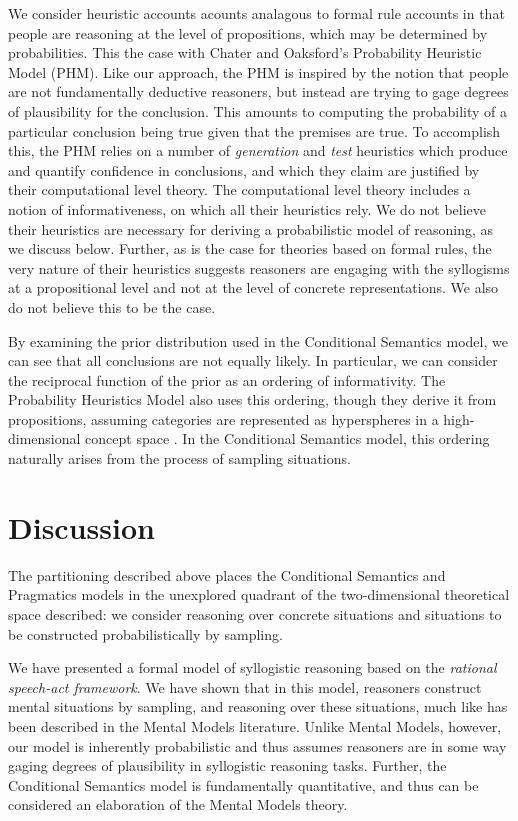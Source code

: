 \documentclass[10pt,letterpaper]{article}
\begin{document}
We consider heuristic accounts acounts analagous to formal rule accounts in that people are reasoning at the level of propositions, which may be determined by probabilities. This the case with Chater and Oaksford's Probability Heuristic Model (PHM). Like our approach, the PHM is inspired by the notion that people are not fundamentally deductive reasoners, but instead are trying to gage degrees of plausibility for the conclusion. This amounts to computing the probability of a particular conclusion being true given that the premises are true. To accomplish this, the PHM relies on a number of {\em generation} and {\em test} heuristics which produce and quantify confidence in conclusions, and which they claim are justified by their computational level theory. The computational level theory includes a notion of informativeness, on which all their heuristics rely. We do not believe their heuristics are necessary for deriving a probabilistic model of reasoning, as we discuss below. Further, as is the case for theories based on formal rules, the very nature of their heuristics suggests reasoners are engaging with the syllogisms at a propositional level and not at the level of concrete representations. We also do not believe this to be the case.

By examining the prior distribution used in the Conditional Semantics model, we can see that all conclusions are not equally likely. In particular, we can consider the reciprocal function of the prior as an ordering of informativity. The Probability Heuristics Model also uses this ordering, though they derive it from propositions, assuming categories are represented as hyperspheres in a high-dimensional concept space \cite{Chater1999}. In the Conditional Semantics model, this ordering naturally arises from the process of sampling situations.

\section{Discussion}

The partitioning described above places the Conditional Semantics and Pragmatics models in the unexplored quadrant of the two-dimensional theoretical space described: we consider reasoning over concrete situations and situations to be constructed probabilistically by sampling.

We have presented a formal model of syllogistic reasoning based on the \emph{rational speech-act framework}. We have shown that in this model, reasoners construct mental situations by sampling, and reasoning over these situations, much like has been described in the Mental Models literature. Unlike Mental Models, however, our model is inherently probabilistic and thus assumes reasoners are in some way gaging degrees of plausibility in syllogistic reasoning tasks. Further, the Conditional Semantics model is fundamentally quantitative, and thus can be considered an elaboration of the Mental Models theory.
\end{document}
